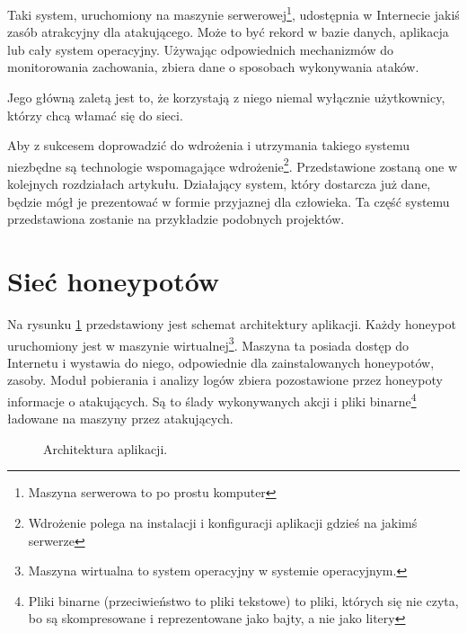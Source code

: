 \documentclass[runningheads,a4paper]{llncs}
\begin{document}
Taki system, uruchomiony na maszynie serwerowej\footnote{Maszyna serwerowa to po prostu komputer}, udostępnia w Internecie jakiś zasób atrakcyjny dla atakującego. Może to być rekord w bazie danych, aplikacja lub cały system operacyjny. Używając odpowiednich mechanizmów do monitorowania zachowania, zbiera dane o sposobach wykonywania ataków.

Jego główną zaletą jest to, że korzystają z niego niemal wyłącznie użytkownicy, którzy chcą włamać się do sieci.

Aby z sukcesem doprowadzić do wdrożenia i utrzymania takiego systemu niezbędne są technologie wspomagające wdrożenie\footnote{Wdrożenie polega na instalacji i konfiguracji aplikacji gdzieś na jakimś serwerze}. Przedstawione zostaną one w kolejnych rozdziałach artykułu. Działający system, który dostarcza już dane, będzie mógł je prezentować w formie przyjaznej dla człowieka. Ta część systemu przedstawiona zostanie na przykładzie podobnych projektów.

\section{Sieć honeypotów}

Na rysunku \ref{fig:architektura_fig} przedstawiony jest schemat architektury aplikacji. Każdy honeypot uruchomiony jest w maszynie wirtualnej\footnote{Maszyna wirtualna to system operacyjny w systemie operacyjnym.}. Maszyna ta posiada dostęp do Internetu i wystawia do niego, odpowiednie dla zainstalowanych honeypotów, zasoby. Moduł pobierania i analizy logów zbiera pozostawione przez honeypoty informacje o atakujących. Są to ślady wykonywanych akcji i pliki binarne\footnote{Pliki binarne (przeciwieństwo to pliki tekstowe) to pliki, których się nie czyta, bo są skompresowane i reprezentowane jako bajty, a nie jako litery} ładowane na maszyny przez atakujących.

\begin{figure}
        \centering
        \caption{Architektura aplikacji.}
        \label{fig:architektura_fig}
\end{figure}
\end{document}
